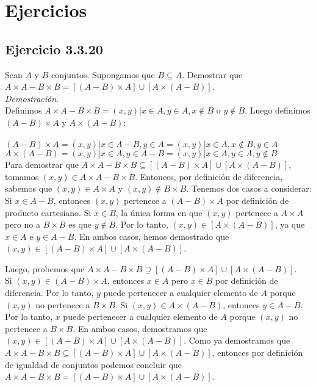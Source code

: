 \documentclass{report}
\begin{document}
    \tableofcontents
    \setcounter{secnumdepth}{0}
    \pagebreak
    \chapter{Ejercicios}

    \section{Ejercicio 3.3.20}
        Sean $A$ y $B$ conjuntos. Supongamos que $B\subseteq A$. Demostrar que $A\times A-B\times B = [(A-B)\times A]\cup[A\times(A-B)]$.\\

        \noindent \textit{Demostración}.\\Definimos $A\times A-B\times B = {(x,y) | x\in A, y\in A, x\notin B \text{ o } y\notin B}$. Luego definimos $(A-B)\times A$ y $A\times(A-B)$:\\\\
        $(A-B)\times A = {(x,y) | x\in A-B, y\in A} = {(x,y) | x\in A, x\notin B, y\in A}$\\
        $A\times(A-B) = {(x,y) | x\in A, y\in A-B} = {(x,y) | x\in A, y\in A, y\notin B}$\\

        \noindent Para demostrar que $A\times A-B\times B\subseteq [(A-B)\times A]\cup [A\times (A-B)]$, tomamos $(x,y)\in A\times A-B\times B$. Entonces, por definición de diferencia, sabemos que $(x,y)\in A\times A$ y $(x,y)\notin B\times B$. Tenemos dos casos a considerar:\\

        \noindent Si $x\in A-B$, entonces $(x,y)$ pertenece a $(A-B)\times A$ por definición de producto cartesiano.
        Si $x\in B$, la única forma en que $(x,y)$ pertenece a $A\times A$ pero no a $B\times B$ es que $y\notin B$. Por lo tanto, $(x,y)\in [A\times (A-B)]$, ya que $x\in A$ e $y\in A-B$.
        En ambos casos, hemos demostrado que $(x,y)\in [(A-B)\times A]\cup [A\times (A-B)]$.

        \noindent Luego, probemos que $A\times A-B\times B\supseteq [(A-B)\times A]\cup [A\times (A-B)]$.\\

        \noindent Si $(x,y)\in (A-B)\times A$, entonces $x\in A$ pero $x\in B$ por definición de diferencia. Por lo tanto, $y$ puede pertenecer a cualquier elemento de $A$ porque $(x,y)$ no pertenece a $B\times B$.
        Si $(x,y)\in A\times (A-B)$, entonces $y\in A-B$. Por lo tanto, $x$ puede pertenecer a cualquier elemento de $A$ porque $(x,y)$ no pertenece a $B\times B$.
        En ambos casos, demostramos que $(x,y)\in [(A-B)\times A]\cup [A\times (A-B)]$. Como ya demostramos que $A\times A-B\times B\subseteq [(A-B)\times A]\cup [A\times (A-B)]$, entonces por definición de igualdad de conjuntos podemos concluir que $A\times A-B\times B = [(A-B)\times A]\cup [A\times (A-B)]$.
\end{document}
